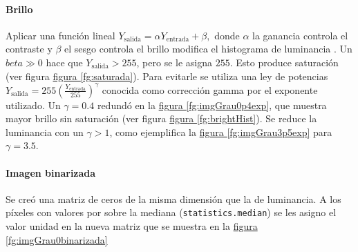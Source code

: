 \documentclass{article}
\begin{document}
\paragraph{Brillo}
Aplicar una función lineal 
$
Y_\mathrm{salida} = \alpha Y_\mathrm{entrada} + \beta ,
$
donde $\alpha$ la ganancia controla el contraste y $\beta$ el sesgo controla el brillo modifica el histograma de luminancia \cite{noauthor_opencv_nodate}.
Un \(beta \gg 0\) hace que \(Y_\mathrm{salida}> 255\), pero se le asigna \(255\).
Esto produce saturación (ver figura \hyperref[fg:saturada]{figura \ref*{fg:saturada}}).
Para evitarle se utiliza una ley de potencias
\(
Y_\mathrm{salida} = 255 \left( \frac{Y_\mathrm{entrada}}{255} \right)^\gamma  
\)
conocida como corrección gamma por el exponente utilizado.
Un \(\gamma= 0.4\) redundó en la \hyperref[fg:imgGrau0p4exp]{figura \ref*{fg:imgGrau0p4exp}}, que muestra mayor brillo sin saturación (ver figura \hyperref[fg:brightHist]{figura \ref*{fg:brightHist}}).
Se reduce la luminancia con un \(\gamma >1\), como ejemplifica la \hyperref[fg:imgGrau3p5exp]{figura \ref*{fg:imgGrau3p5exp}} para \(\gamma = 3.5\).



\paragraph{Imagen binarizada}	
Se creó una matriz de ceros de la misma dimensión que la de luminancia.
A los píxeles con valores por sobre la mediana (\verb'statistics.median') se les asigno el valor unidad en la nueva matriz que se muestra en la \hyperref[fg:imgGrau0binarizada]{figura \ref*{fg:imgGrau0binarizada}}






\end{document}
